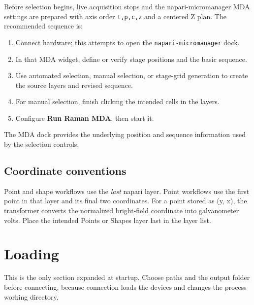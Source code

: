 \documentclass[11pt,oneside]{report}
\newcommand{\ui}[1]{\textbf{#1}}
\newcommand{\code}[1]{\texttt{#1}}
\begin{document}
Before selection begins, live acquisition stops and the napari-micromanager MDA
settings are prepared with axis order \code{t,p,c,z} and a centered Z plan. The
recommended sequence is:
\begin{enumerate}
  \item Connect hardware; this attempts to open the \code{napari-micromanager} dock.
  \item In that MDA widget, define or verify stage positions and the basic sequence.
  \item Use automated selection, manual selection, or stage-grid generation to
        create the source layers and revised sequence.
  \item For manual selection, finish clicking the intended cells in the layers.
  \item Configure \ui{Run Raman MDA}, then start it.
\end{enumerate}
The MDA dock provides the underlying position and sequence information used by
the selection controls.

\section{Coordinate conventions}
Point and shape workflows use the \emph{last} napari layer. Point workflows use
the first point in that layer and its final two coordinates. For a point stored as
(y, x), the transformer converts the normalized bright-field coordinate into
galvanometer volts. Place the intended Points or Shapes layer last in the layer list.

\chapter{Loading}
This is the only section expanded at startup. Choose paths and the output folder
before connecting, because connection loads the devices and changes the process
working directory.
\end{document}
